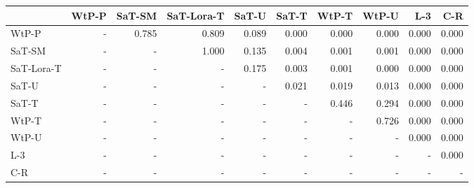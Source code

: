 \begin{tabular}{lrrrrrrrrr}
\toprule
 & WtP-P & SaT-SM & SaT-Lora-T & SaT-U & SaT-T & WtP-T & WtP-U & L-3 & C-R \\
\midrule
WtP-P & - & 0.785 & 0.809 & 0.089 & 0.000 & 0.000 & 0.000 & 0.000 & 0.000 \\
SaT-SM & - & - & 1.000 & 0.135 & 0.004 & 0.001 & 0.001 & 0.000 & 0.000 \\
SaT-Lora-T & - & - & - & 0.175 & 0.003 & 0.001 & 0.000 & 0.000 & 0.000 \\
SaT-U & - & - & - & - & 0.021 & 0.019 & 0.013 & 0.000 & 0.000 \\
SaT-T & - & - & - & - & - & 0.446 & 0.294 & 0.000 & 0.000 \\
WtP-T & - & - & - & - & - & - & 0.726 & 0.000 & 0.000 \\
WtP-U & - & - & - & - & - & - & - & 0.000 & 0.000 \\
L-3 & - & - & - & - & - & - & - & - & 0.000 \\
C-R & - & - & - & - & - & - & - & - & - \\
\bottomrule
\end{tabular}

